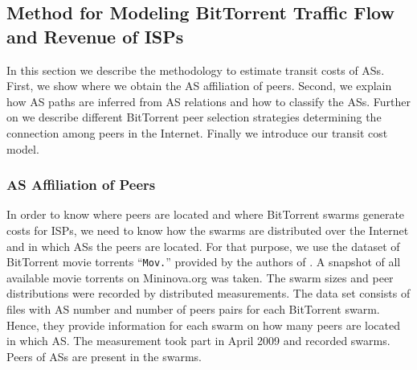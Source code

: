 \subsection{Method for Modeling BitTorrent Traffic Flow and Revenue of ISPs}\label{sec:p2p:methodology}

In this section we describe the methodology to estimate transit costs of ASs. First, we show where we obtain the AS affiliation of peers. Second, we explain how AS paths are inferred from AS relations and how to classify the ASs. Further on we describe different BitTorrent peer selection strategies determining the connection among peers in the Internet. Finally we introduce our transit cost model.

\subsubsection{AS Affiliation of Peers}

In order to know where peers are located and where BitTorrent swarms generate costs for ISPs, we need to know how the swarms are distributed over the Internet and in which ASs the peers are located. For that purpose, we use the dataset of BitTorrent movie torrents ``\texttt{Mov.}'' provided by the authors of \cite{Hossfeld2011}. A snapshot of all available movie torrents on Mininova.org was taken. The swarm sizes and peer distributions were recorded by distributed measurements. The data set consists of files with AS number and number of peers pairs for each BitTorrent swarm. Hence, they provide information for each swarm on how many peers are located in which AS. The measurement took part in April 2009 and recorded  swarms. Peers of  ASs are present in the swarms.




